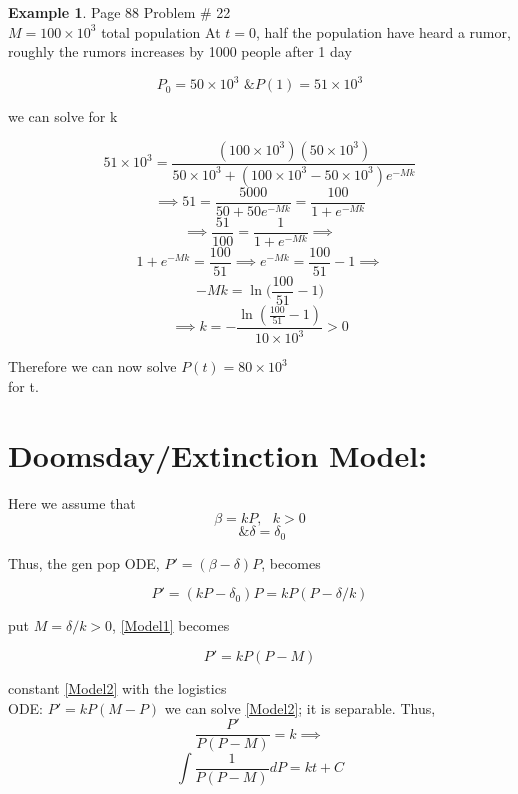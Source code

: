 \documentclass[10pt,a4paper]{article}
\theoremstyle{definition}
\newtheorem*{example}{Example}
\begin{document}
  \begin{example}
    Page 88 Problem \# 22 \\
    \(M=100 \times 10^3 \) total population At \( t=0 \), half the
    population have heard a rumor, roughly the rumors increases by 1000
    people after 1 day 

    \[ P_0 = 50 \times 10^3 \text{ \&   } P(1) = 51 \times 10^3 \]

    we can solve for k

    \[ 51 \times 10^3 = \frac{(100 \times 10^3) (50 \times 10^3)}{ 50
    \times 10^3 + (100 \times 10^3 - 50 \times 10^3) e^{-Mk}} \]
    \[ \implies 51 = \frac{5000}{50 +50e^{-Mk}} = \frac{100}{1+e^{-Mk}} \]
    \[ \implies \frac{51}{100} = \frac{1}{1+e^{-Mk}} \implies  \]
    \[  1+ e^{-Mk} = \frac{100}{51} \implies  e^{-Mk} = \frac{100}{51} -1
    \implies \]
    \[ -Mk = \ln \bigg( \frac{100}{51} -1 \bigg) \]
    \[ \implies k= - \frac{\ln ( \frac{100}{51} - 1)}{10 \times 10^3} > 0 \]

    Therefore we can now solve \( P(t) = 80 \times 10^3 \) \\
    for t. \\

  \end{example}

\section{Doomsday/Extinction Model:} 

  Here we assume that 
  \[ \beta = kP, \text{  } k>0 \]
  \[ \text{ \& } \delta  = \delta_0 \]

  Thus, the gen pop ODE, \( P' = (\beta -\delta )P \), becomes 

  \begin{equation}
    \tag{1}
    \label{Model1}
    P' = (kP-\delta_0)P = kP(P-\delta/k )
  \end{equation}

  put \( M = \delta / k > 0 \),
  \eqref{Model1} becomes

  \begin{equation}
    \tag{2}
    \label{Model2}
    P' = kP(P-M)
  \end{equation}

  constant \eqref{Model2} with the logistics \\
  ODE: \( P' =kP(M-P) \) we 
  can solve \eqref{Model2}; it is separable. Thus,
  \[ \frac{P'}{P(P-M)}= k \implies  \]
  \[ \int \frac{1}{P(P-M)}dP = kt + C \]
\end{document}
